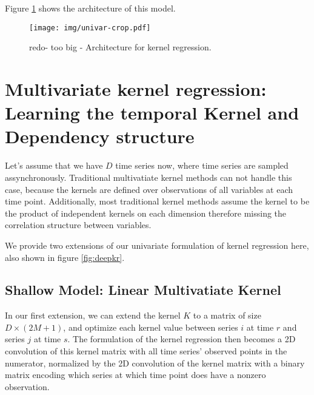 \documentclass{article} %
\begin{document}
Figure \ref{fig:arch} shows the architecture of this model.

\begin{figure}[h]
\begin{center}
\texttt{[image: img/univar-crop.pdf]}
\end{center}
\caption{redo- too big - Architecture for kernel regression.}\label{fig:arch}
\end{figure}

\section{Multivariate kernel regression: Learning the temporal Kernel and Dependency structure}

Let's assume that we have $D$ time series now, where time series are sampled assynchronously. Traditional multivatiate kernel methods can not handle this case, because the kernels are defined over observations of all variables at each time point. Additionally, most traditional kernel methods assume the kernel to be the product of independent kernels on each dimension therefore missing the correlation structure between variables.

We provide two extensions of our univariate formulation of kernel regression here, also shown in figure \ref{fig:deepkr}. 

\subsection{Shallow Model: Linear Multivatiate Kernel}
In our first extension, we can extend the kernel $K$ to a matrix of size $D \times (2M+1)$, and optimize each kernel value between series $i$ at time $r$ and series $j$ at time $s$. The formulation of the kernel regression then becomes a 2D convolution of this kernel matrix with all time series' observed points in the numerator, normalized by the 2D convolution of the kernel matrix with a binary matrix encoding which series at which time point does have a nonzero observation. 
\end{document}
